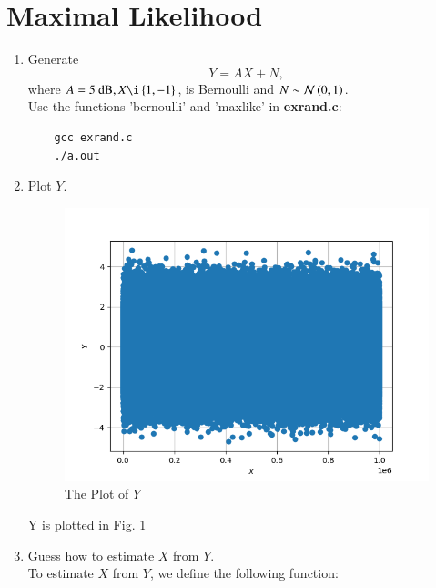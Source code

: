 \documentclass[journal,12pt,twocolumn]{IEEEtran}
\renewcommand\thesection{\arabic{section}}
\begin{document}
\section{Maximal Likelihood}
\begin{enumerate}[label=\thesection.\arabic*
    ,ref=\thesection.\theenumi]



\item Generate 
    \begin{equation}
    Y = AX+N,
    \end{equation}
            where $A = 5 \text{ dB}, X \i \cbrak{1,-1}$,  is Bernoulli and $N \sim \mathcal{N}\left(0,1\right)$.
    \\
    \solution Use the functions 'bernoulli' and 'maxlike' in \textbf{exrand.c}:

\begin{lstlisting}
    gcc exrand.c
    ./a.out
\end{lstlisting}



\item Plot $Y$.

\begin{figure}
    \centering
    \includegraphics[width=\columnwidth]{./figures/Noise.png}
    \caption{The Plot of $Y$}
    \label{fig:noise}
    \end{figure}

    Y is plotted in Fig. \ref{fig:noise}  




    \item Guess how to estimate $X$ from $Y$.
\\
\solution To estimate $X$ from $Y$, we define the following function:


\end{enumerate}
\end{document}
